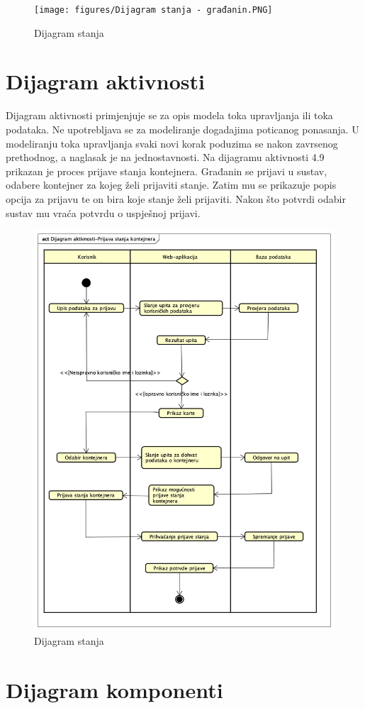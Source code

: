 			\begin{figure}[H]
				\texttt{[image: figures/Dijagram stanja - građanin.PNG]}
				\centering
				\caption{Dijagram stanja}
				\label{fig:Dijagram stanja}
			\end{figure}
			
			\eject 
		
		\section{Dijagram aktivnosti}
			
			Dijagram aktivnosti primjenjuje se za opis modela toka upravljanja ili toka podataka. Ne upotrebljava se za modeliranje dogadajima poticanog ponasanja. U modeliranju toka upravljanja svaki novi korak poduzima se nakon zavrsenog prethodnog, a naglasak je na jednostavnosti. Na dijagramu aktivnosti 4.9 prikazan je proces prijave stanja kontejnera. Građanin se prijavi u sustav, odabere kontejner za kojeg želi prijaviti stanje. Zatim mu se prikazuje popis opcija za prijavu te on bira koje stanje želi prijaviti. Nakon što potvrdi odabir sustav mu vraća potvrdu o uspješnoj prijavi.
			
			\begin{figure}[H]
				\includegraphics[scale=0.4]{figures/Dijagram aktivnosti-Prijava stanja kontejnera.PNG}
				\centering
				\caption{Dijagram stanja}
				\label{fig:Dijagram stanja}
			\end{figure} 
			
			
			\eject
		\section{Dijagram komponenti}
		
